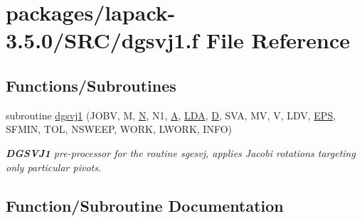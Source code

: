 \hypertarget{dgsvj1_8f}{}\section{packages/lapack-\/3.5.0/\+S\+R\+C/dgsvj1.f File Reference}
\label{dgsvj1_8f}
\subsection*{Functions/\+Subroutines}
\begin{DoxyCompactItemize}
\item 
subroutine \hyperlink{dgsvj1_8f_ab4abc17f4e1a5322998b6f9e84dd6d6f}{dgsvj1} (J\+O\+B\+V, M, \hyperlink{polmisc_8c_a0240ac851181b84ac374872dc5434ee4}{N}, N1, \hyperlink{classA}{A}, \hyperlink{example__user_8c_ae946da542ce0db94dced19b2ecefd1aa}{L\+D\+A}, \hyperlink{odrpack_8h_a7dae6ea403d00f3687f24a874e67d139}{D}, S\+V\+A, M\+V, V, L\+D\+V, \hyperlink{tukey_8c_a6ebf6899d6c1c8b7b9d09be872c05aae}{E\+P\+S}, S\+F\+M\+I\+N, T\+O\+L, N\+S\+W\+E\+E\+P, W\+O\+R\+K, L\+W\+O\+R\+K, I\+N\+F\+O)
\begin{DoxyCompactList}\small\item\em {\bfseries D\+G\+S\+V\+J1} pre-\/processor for the routine sgesvj, applies Jacobi rotations targeting only particular pivots. \end{DoxyCompactList}\end{DoxyCompactItemize}


\subsection{Function/\+Subroutine Documentation}
\hypertarget{dgsvj1_8f_ab4abc17f4e1a5322998b6f9e84dd6d6f}{}

